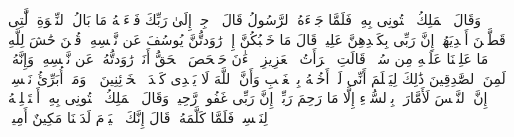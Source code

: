 وَقَالَ ٱلۡمَلِكُ ٱئۡتُونِی بِهِۦۖ فَلَمَّا جَاۤءَهُ ٱلرَّسُولُ قَالَ ٱرۡجِعۡ إِلَىٰ رَبِّكَ فَسۡءَلۡهُ مَا بَالُ ٱلنِّسۡوَةِ ٱلَّٰتِی قَطَّعۡنَ أَیۡدِیَهُنَّۚ إِنَّ رَبِّی بِكَیۡدِهِنَّ عَلِیمࣱ%
\stopbuffer
\startbuffer[\q:12:51]
قَالَ مَا خَطۡبُكُنَّ إِذۡ رَٰوَدتُّنَّ یُوسُفَ عَن نَّفۡسِهِۦۚ قُلۡنَ حَٰشَ لِلَّهِ مَا عَلِمۡنَا عَلَیۡهِ مِن سُوۤءࣲۚ قَالَتِ ٱمۡرَأَتُ ٱلۡعَزِیزِ ٱلۡءَٰنَ حَصۡحَصَ ٱلۡحَقُّ أَنَا۠ رَٰوَدتُّهُۥ عَن نَّفۡسِهِۦ وَإِنَّهُۥ لَمِنَ ٱلصَّٰدِقِینَ%
\stopbuffer
\startbuffer[\q:12:52]
ذَٰلِكَ لِیَعۡلَمَ أَنِّی لَمۡ أَخُنۡهُ بِٱلۡغَیۡبِ وَأَنَّ ٱللَّهَ لَا یَهۡدِی كَیۡدَ ٱلۡخَاۤئِنِینَ%
\stopbuffer
\startbuffer[\q:12:53]
۞ وَمَاۤ أُبَرِّئُ نَفۡسِیۤۚ إِنَّ ٱلنَّفۡسَ لَأَمَّارَةُۢ بِٱلسُّوۤءِ إِلَّا مَا رَحِمَ رَبِّیۤۚ إِنَّ رَبِّی غَفُورࣱ رَّحِیمࣱ%
\stopbuffer
\startbuffer[\q:12:54]
وَقَالَ ٱلۡمَلِكُ ٱئۡتُونِی بِهِۦۤ أَسۡتَخۡلِصۡهُ لِنَفۡسِیۖ فَلَمَّا كَلَّمَهُۥ قَالَ إِنَّكَ ٱلۡیَوۡمَ لَدَیۡنَا مَكِینٌ أَمِینࣱ%
\stopbuffer
